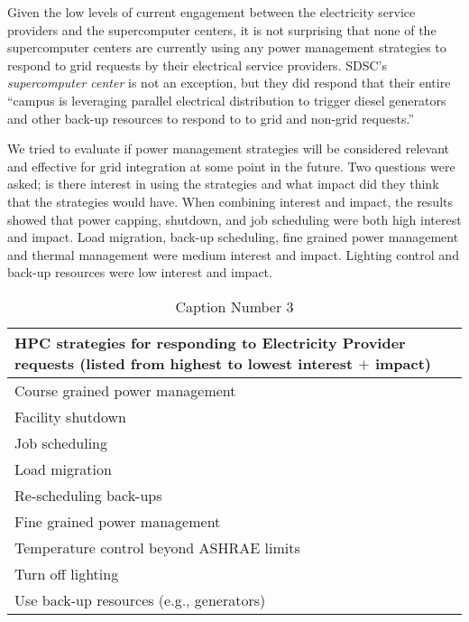 Given the low levels of current engagement between the electricity service
providers and the supercomputer centers, it is not surprising that none of
the supercomputer centers are currently using any power management
strategies to respond to grid requests by their electrical service
providers. SDSC's \textit{supercomputer center} is not an exception, but they did respond that their
entire ``campus is leveraging parallel electrical distribution to trigger
diesel generators and other back-up resources to respond to to grid and
non-grid requests.''

We tried to evaluate if power management strategies will be considered
relevant and effective for grid integration at some point in the future. Two
questions were asked; is there interest in using the strategies and what
impact did they think that the strategies would have. When combining
interest and impact, the results showed that power capping, shutdown, and
job scheduling were both high interest and impact. Load migration, back-up
scheduling, fine grained power management and thermal management were medium
interest and impact. Lighting control and back-up resources were low
interest and impact.


\begin{table}[htbp]

\begin{center}
\caption{Caption Number 3}
\begin{tabular}{|p{299pt}|}
\hline
\textbf{HPC strategies for responding to Electricity Provider requests (listed from highest to lowest interest }$+$\textbf{ impact)} \\
\hline
Course grained power management \\
\hline
Facility shutdown \\
\hline
Job scheduling \\
\hline
Load migration \\
\hline
Re-scheduling back-ups \\
\hline
Fine grained power management \\
\hline
Temperature control beyond ASHRAE limits \\
\hline
Turn off lighting \\
\hline
Use back-up resources (e.g., generators) \\
\hline
\end{tabular}
\label{tab3}
\end{center}
\end{table}
